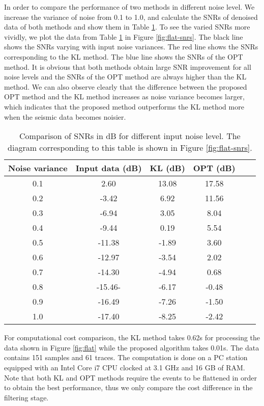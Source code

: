 In order to compare the performance of two methods in different noise level. We increase the variance of noise  from 0.1 to 1.0, and calculate the SNRs of denoised data of both methods and show them in Table \ref{tbl:snrs}.  To see the varied SNRs more vividly, we plot the data from Table \ref{tbl:snrs} in Figure \ref{fig:flat-snrs}. The black line shows the SNRs varying with input noise variances. The red line shows the SNRs corresponding to the KL method. The blue line shows the SNRs of the OPT method.  It is obvious that both methods obtain large SNR improvement for all noise levels and the SNRs of the OPT method are always higher than the KL method. We can also observe clearly that the difference between the proposed OPT method and the KL method increases as noise variance becomes larger, which indicates that the proposed method outperforms the KL method more when the seismic data becomes noisier. 

\begin{table}[h]
\caption{Comparison of SNRs in dB for different input noise level. The diagram corresponding to this table is shown in Figure \ref{fig:flat-snrs}.}
\begin{center}
    \begin{tabular}{|c|c|c|c|c|c|} 
  \hline Noise variance & Input data (dB) & KL (dB) & OPT (dB) \\ 
  \hline 0.1 & 2.60  & 13.08 & 17.58 \\
  \hline 0.2 & -3.42 & 6.92 & 11.56\\
  \hline 0.3 & -6.94 & 3.05 & 8.04 \\
  \hline 0.4 & -9.44 & 0.19 & 5.54 \\
  \hline 0.5 & -11.38 & -1.89&3.60\\
  \hline 0.6 & -12.97 &-3.54&2.02\\
  \hline 0.7 & -14.30 &-4.94&0.68\\
  \hline 0.8 & -15.46-&-6.17&-0.48\\
  \hline 0.9 & -16.49 &-7.26&-1.50\\
  \hline 1.0 & -17.40 & -8.25 &-2.42\\
         \hline
   \end{tabular} 
\end{center}
\label{tbl:snrs}
\end{table}

For computational cost comparison, the KL method takes 0.62s for processing the data shown in Figure \ref{fig:flat} while the proposed algorithm takes 0.01s. The data contains 151 samples and 61 traces. The computation is done on a PC station equipped with an Intel Core i7 CPU clocked at 3.1 GHz and 16 GB of RAM. Note that both KL and OPT methods require the events to be flattened in order to obtain the best performance, thus we only compare the cost difference in the filtering stage. 

